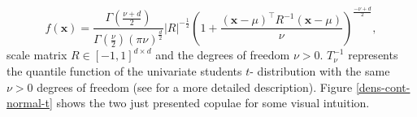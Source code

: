 \begin{equation}
	f(\mathbf{x})=\frac{\Gamma\left(\frac{\nu+d}{2}\right)}{\Gamma\left(\frac{\nu}{2}\right) (\pi \nu)^{\frac{d}{2}}}|R|^{-\frac{1}{2}}\left(1+\frac{(\mathbf{x}-\mu)^{\top} R^{-1}(\mathbf{x}-\mu)}{\nu}\right)^{\frac{-\nu+d}{2}},
\end{equation}
%
scale matrix $R \in \left[ -1,1\right]^{d\times d}$ and the degrees of freedom $\nu > 0$. $T_{\nu}^{-1}$ represents the quantile function of the univariate students $t$- distribution with the same $\nu > 0$ degrees of freedom (see \citet{demarta2005t} for a more detailed description). Figure \ref{dens-cont-normal-t} shows the two just presented copulae for some visual intuition.

\begin{figure}[!ht]
	\hfill
	\hfill
\end{figure}
